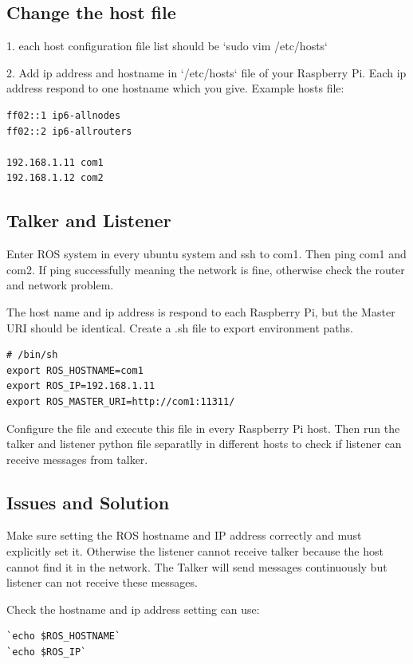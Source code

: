 \documentclass{mproj}
\begin{document}
\subsection{Change the host file}
1. each host configuration file list should be  
    `sudo vim /etc/hosts`
    
2. Add ip address and hostname in `/etc/hosts` file of your Raspberry Pi. Each ip address respond to one hostname which you give.
Example hosts file:

\begin{verbatim}
ff02::1 ip6-allnodes
ff02::2 ip6-allrouters

192.168.1.11 com1
192.168.1.12 com2
\end{verbatim}

\subsection{Talker and Listener}
Enter ROS system in every ubuntu system and ssh to com1. Then ping com1 and com2. If ping successfully meaning the network is fine, otherwise check the router and network problem.

The host name and ip address is respond to each Raspberry Pi, but the Master URI should be identical. Create a .sh file to export environment paths.
\begin{verbatim}
# /bin/sh
export ROS_HOSTNAME=com1
export ROS_IP=192.168.1.11
export ROS_MASTER_URI=http://com1:11311/
\end{verbatim}

Configure the file and execute this file in every Raspberry Pi host. Then run the talker and listener python file separatlly in different hosts to check if listener can receive messages from talker.

\subsection{Issues and Solution}
Make sure setting the ROS hostname and IP address correctly and must explicitly set it. Otherwise the listener cannot receive talker because the host cannot find it in the network. The Talker will send messages continuously but listener can not receive these messages.

Check the hostname and ip address setting can use:
\begin{verbatim}
`echo $ROS_HOSTNAME`
`echo $ROS_IP`
\end{verbatim}

\end{document}
